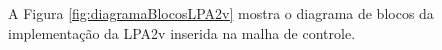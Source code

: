 A Figura \ref{fig:diagramaBlocosLPA2v} mostra 
o diagrama de blocos da implementação da 
LPA2v inserida na malha de controle. 


